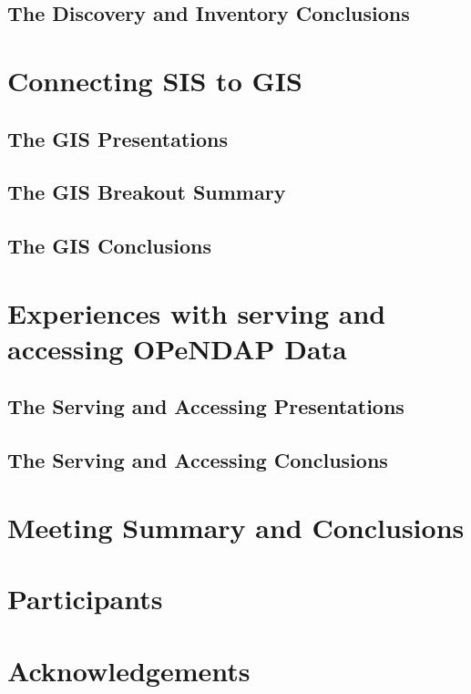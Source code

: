 \documentclass[12pt,titlepage]{dods-paper}
\begin{document}
   \subsection{The Discovery and Inventory Conclusions}
      
\section{Connecting \acs{SIS} to \acs{GIS}}
   \subsection{The \ac{GIS} Presentations}
      
   \subsection{The \ac{GIS} Breakout Summary}
      
   \subsection{The \ac{GIS} Conclusions}
      
\section{Experiences with serving and accessing \acs{OPeNDAP} Data}
   \subsection{The Serving and Accessing Presentations}
       
   \subsection{The Serving and Accessing Conclusions}
       
\section{Meeting Summary and Conclusions}
    
\section{Participants}
     
\section{Acknowledgements}
     

\end{document}
